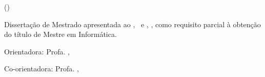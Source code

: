 \thispagestyle{empty}
\makeatletter
\begin{spacing}{1}
\begin{center}

\large \MakeUppercase{\@faculdade}

\large \MakeUppercase{\@instcomp}

\large \MakeUppercase{\@instnce}

\large \MakeUppercase{\@programa} (\@progsigla)

\vspace{2cm}
\large \MakeUppercase{\@author}

\vspace{2cm}
\large \textbf{\MakeUppercase{\@title}}
\end{center}

\vspace{0.5cm}
\begin{quoting}[leftmargin=7.5cm, rightmargin=1cm]
Dissertação de Mestrado apresentada ao \@programa, \@instcomp\ e  \@instnce, \@faculdade, como requisito parcial à obtenção do título de Mestre em Informática.
\end{quoting}

\vspace{2cm}
Orientadora: Profa. \@orientadora, \@orientadorastitulo

Co-orientadora: Profa. \@coorientadora, \@orientadorastitulo

\vspace*{\fill}
\begin{center}
\@cidade\\
\@date
\end{center}

\end{spacing}
\makeatother
\newpage